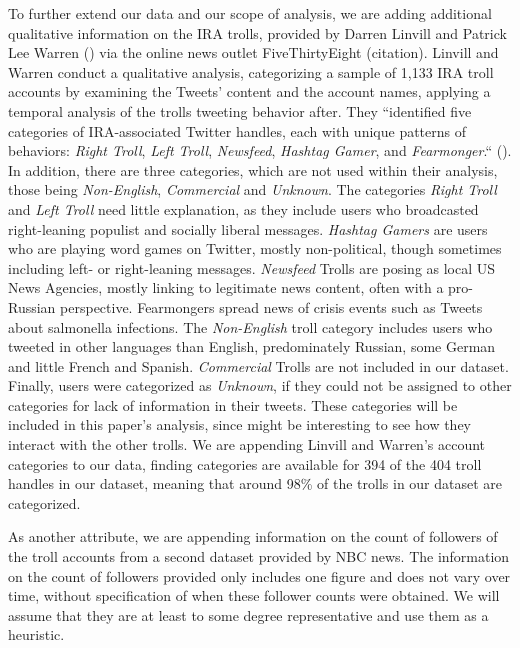 \documentclass[12pt, titlepage=true, toc=bib]{scrartcl}
\begin{document}
To further extend our data and our scope of analysis, we are adding additional qualitative information on the IRA trolls, provided by Darren Linvill and Patrick Lee Warren (\cite*{linvill_troll_2018}) via the online news outlet FiveThirtyEight (citation). Linvill and Warren conduct a qualitative analysis, categorizing a sample of 1,133 IRA troll accounts by examining the Tweets’ content and the account names, applying a temporal analysis of the trolls tweeting behavior after. They “identified five categories of IRA-associated Twitter handles, each with unique patterns of behaviors: \textit{Right Troll}, \textit{Left Troll}, \textit{Newsfeed}, \textit{Hashtag Gamer}, and \textit{Fearmonger}.“ (\cite[6]{linvill_troll_2018}). In addition, there are three categories, which are not used within their analysis, those being \textit{Non-English}, \textit{Commercial} and \textit{Unknown}. The categories \textit{Right Troll} and \textit{Left Troll} need little explanation, as they include users who broadcasted right-leaning populist and socially liberal messages. \textit{Hashtag Gamers} are users who are playing word games on Twitter, mostly non-political, though sometimes including left- or right-leaning messages. \textit{Newsfeed} Trolls are posing as local US News Agencies, mostly linking to legitimate news content, often with a pro-Russian perspective. Fearmongers spread news of crisis events such as Tweets about salmonella infections. The \textit{Non-English} troll category includes users who tweeted in other languages than English, predominately Russian, some German and little French and Spanish. \textit{Commercial} Trolls are not included in our dataset. Finally, users were categorized as \textit{Unknown}, if they could not be assigned to other categories for lack of information in their tweets. These categories will be included in this paper's analysis, since might be interesting to see how they interact with the other trolls. We are appending Linvill and Warren's account categories to our data, finding categories are available for 394 of the 404 troll handles in our dataset, meaning that around 98\% of the trolls in our dataset are categorized.
 
As another attribute, we are appending information on the count of followers of the troll accounts from a second dataset provided by NBC news. The information on the count of followers provided only includes one figure and does not vary over time, without specification of when these follower counts were obtained. We will assume that they are at least to some degree representative and use them as a heuristic. 
\end{document}
